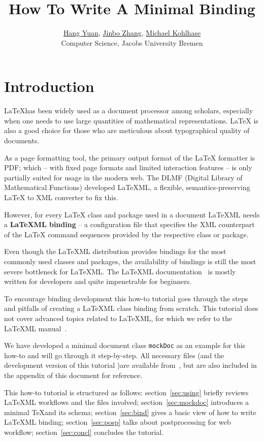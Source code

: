\documentclass[a4paper]{article}
\title{\textbf{How To Write A Minimal \latexml Binding}}
\author{\href{mailto:h.yuan@jacobs-university.de}{Hang Yuan}, 
	\href{mailto:jin.zhang@jacobs-university.de}{Jinbo Zhang},
        \href{mailto:m.kohlhase@jacobs-university.de}{Michael Kohlhase}\\
        Computer Science, Jacobs University Bremen}
\def\latexml{{\LaTeX}ML\xspace}
\begin{document}
\maketitle

\section{Introduction}\label{sec:intro}

{\LaTeX}has been widely used as a document processor among scholars, especially when one
needs to use large quantities of mathematical representations. {\LaTeX} is also a good
choice for those who are meticulous about typographical quality of documents.

As a page formatting tool, the primary output format of the {\LaTeX} formatter is PDF;
which -- with fixed page formats and limited interaction features -- is only partially
suited for usage in the modern web. The DLMF (Digital Library of Mathematical Functions)
developed \latexml, a flexible, semantics-preserving {\LaTeX} to XML converter to fix
this.

However, for every {\LaTeX} class and package used in a document \latexml needs a
\textbf{\latexml binding} -- a configuration file that specifies the XML counterpart of
the {\LaTeX} command sequences provided by the respective class or package. 

Even though the \latexml distribution provides bindings for the most commonly used classes
and packages, the availability of bindings is still the most severe bottleneck for
\latexml. The \latexml documentation~\cite{LaTeXML:manual} is mostly written for developers and
quite impenetrable for beginners.

To encourage binding development this how-to tutorial goes through the steps and pitfalls
of creating a \latexml class binding from scratch. This tutorial does not cover advanced
topics related to \latexml, for which we refer to the \latexml manual~\cite{LaTeXML:manual}.

We have developed a minimal document class \lstinline|mockDoc| as an example for this
how-to and will go through it step-by-step. All necessary files (and the development
version of this tutorial )are available from~\cite{mockDoc:git}, but are also included in
the appendix of this document for reference.

This how-to tutorial is structured as follows: section~\ref{sec:using} briefly reviews
\latexml workflows and the files involved; section~\ref{sec:mockdoc} introduces a minimal \TeX and its 
schema; section~\ref{sec:bind} gives a basic view of how to write \latexml binding; section~\ref{sec:posp} talks about postprocessing for web workflow; section~\ref{sec:concl} concludes the tutorial.
\end{document}
